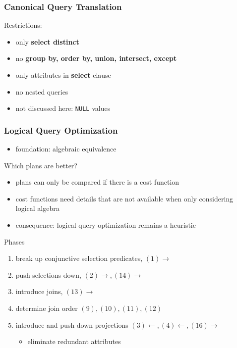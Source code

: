 \documentclass[11pt]{article}
\begin{document}
\subsubsection{Canonical Query Translation}
\label{sec:org00dcf2d}
Restrictions:
\begin{itemize}
\item only \textbf{select distinct}
\item no \textbf{group by, order by, union, intersect, except}
\item only attributes in \textbf{select} clause
\item no nested queries
\item not discussed here: \texttt{NULL} values
\end{itemize}

\subsubsection{Logical Query Optimization}
\label{sec:org457a05f}
\begin{itemize}
\item foundation: algebraic equivalence
\end{itemize}

Which plans are better?
\begin{itemize}
\item plans can only be compared if there is a cost function
\item cost functions need details that are not available when only considering logical algebra
\item consequence: logical query optimization remains a heuristic
\end{itemize}

Phases
\begin{enumerate}
\item break up conjunctive selection predicates, \((1)\to\)
\item push selections down, \((2)\to,(14)\to\)
\item introduce joins, \((13)\to\)
\item determine join order \((9),(10),(11),(12)\)
\item introduce and push down projections \((3)\leftarrow,(4)\leftarrow,(16)\to\)
\begin{itemize}
\item eliminate redundant attributes
\end{itemize}
\end{enumerate}
\end{document}
